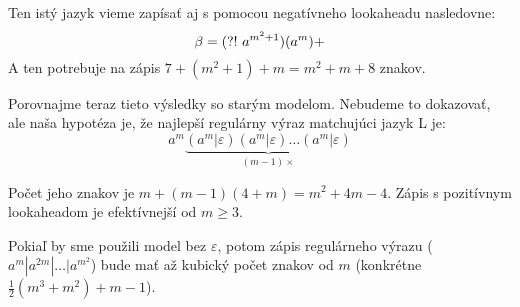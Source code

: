Ten istý jazyk vieme zapísať aj s pomocou negatívneho lookaheadu nasledovne:
$$\beta = \text{(?!~} a^{m^2+1})(a^m)+$$
A ten potrebuje na zápis $7+(m^2+1)+m = m^2 + m + 8$ znakov.

Porovnajme teraz tieto výsledky so starým modelom. Nebudeme to dokazovať, ale naša hypotéza je, že najlepší regulárny výraz matchujúci jazyk L je:
$$a^m
\underbrace{
(a^m|\varepsilon)(a^m|\varepsilon)\dots(a^m|\varepsilon)
}_{(m-1)\times}
$$

Počet jeho znakov je $m+(m-1)(4+m) = m^2+4m-4$. Zápis s pozitívnym lookaheadom je efektívnejší od $m\geq 3$.

Pokiaľ by sme použili model bez $\varepsilon$, potom zápis regulárneho výrazu ($a^m|a^{2m}|\dots|a^{m^2}$) bude mať až kubický počet znakov od $m$ (konkrétne $\frac{1}{2}(m^3+m^2)+m-1$).